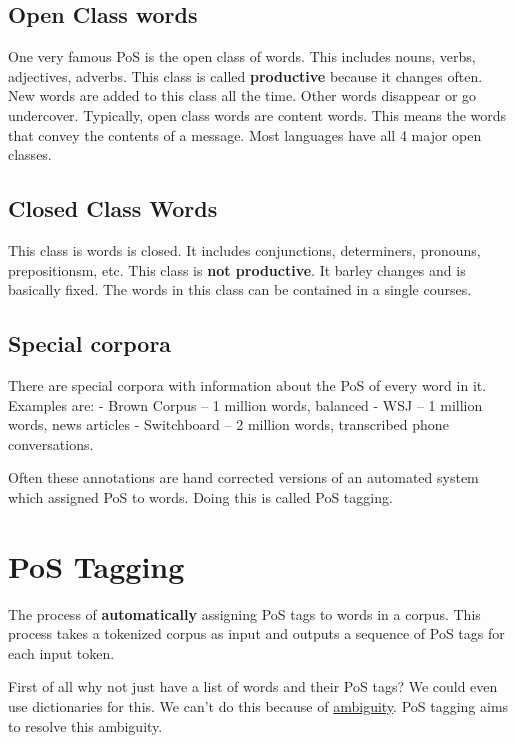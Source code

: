 \documentclass[
  11pt,
  british,
]{article}
\begin{document}
\hypertarget{open-class-words}{%
\subsection{Open Class words}\label{open-class-words}}

One very famous PoS is the open class of words. This includes nouns,
verbs, adjectives, adverbs. This class is called \textbf{productive}
because it changes often. New words are added to this class all the
time. Other words disappear or go undercover. Typically, open class
words are content words. This means the words that convey the contents
of a message. Most languages have all 4 major open classes.

\hypertarget{closed-class-words}{%
\subsection{Closed Class Words}\label{closed-class-words}}

This class is words is closed. It includes conjunctions, determiners,
pronouns, prepositionsm, etc. This class is \textbf{not productive}. It
barley changes and is basically fixed. The words in this class can be
contained in a single courses.

\hypertarget{special-corpora}{%
\subsection{Special corpora}\label{special-corpora}}

There are special corpora with information about the PoS of every word
in it. Examples are: - Brown Corpus -- 1 million words, balanced - WSJ
-- 1 million words, news articles - Switchboard -- 2 million words,
transcribed phone conversations.

Often these annotations are hand corrected versions of an automated
system which assigned PoS to words. Doing this is called PoS tagging.

\hypertarget{pos-tagging}{%
\section{PoS Tagging}\label{pos-tagging}}

The process of \textbf{automatically} assigning PoS tags to words in a
corpus. This process takes a tokenized corpus as input and outputs a
sequence of PoS tags for each input token.

First of all why not just have a list of words and their PoS tags? We
could even use dictionaries for this. We can't do this because of
\href{Ambiguity.md}{ambiguity}. PoS tagging aims to resolve this
ambiguity.
\end{document}
